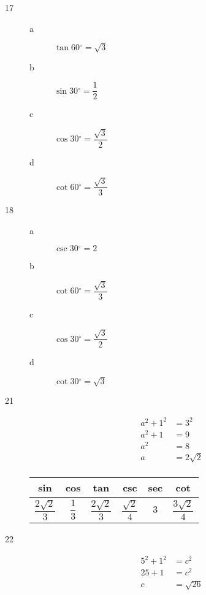 \documentclass[fleqn,addpoints]{exam}
\newcommand{\degree}{\ensuremath{^\circ}}
\begin{document}
\begin{description}
\item[17]
\begin{description}
\item[a] $\tan 60 \degree = \sqrt{3}$

\item[b] $\sin 30 \degree = \dfrac{1}{2}$

\item[c] $\cos 30 \degree = \dfrac{\sqrt{3}}{2}$

\item[d] $\cot 60 \degree = \dfrac{\sqrt{3}}{3}$

\end{description}

\item[18]
\begin{description}
\item[a] $\csc 30 \degree = 2$

\item[b] $\cot 60 \degree = \dfrac{\sqrt{3}}{3}$

\item[c] $\cos 30 \degree = \dfrac{\sqrt{3}}{2}$

\item[d] $\cot 30 \degree = \sqrt{3}$

\end{description}

\item[21]
\begin{align*}
  a^2 + 1^2 &= 3^2 \\
  a^2 + 1 &= 9 \\
  a^2 &= 8 \\
  a &= 2 \sqrt{2} \\
\end{align*}

\begin{tabular}{cccccc}
\toprule
sin & cos & tan & csc & sec & cot \\
\midrule
  $\dfrac{2 \sqrt{2}}{3}$ &  $\dfrac{1}{3}$ & $\dfrac{2 \sqrt{2}}{3}$ & $\dfrac{\sqrt{2}}{4}$ & $3$ & $\dfrac{3 \sqrt{2}}{4}$ \\
\bottomrule
\end{tabular}

 \item[22]
\begin{align*}
  5^2 + 1^2 &= c^2 \\
  25 + 1 &= c^2 \\
  c &= \sqrt{26} \\
\end{align*}


\end{description}
\end{document}
